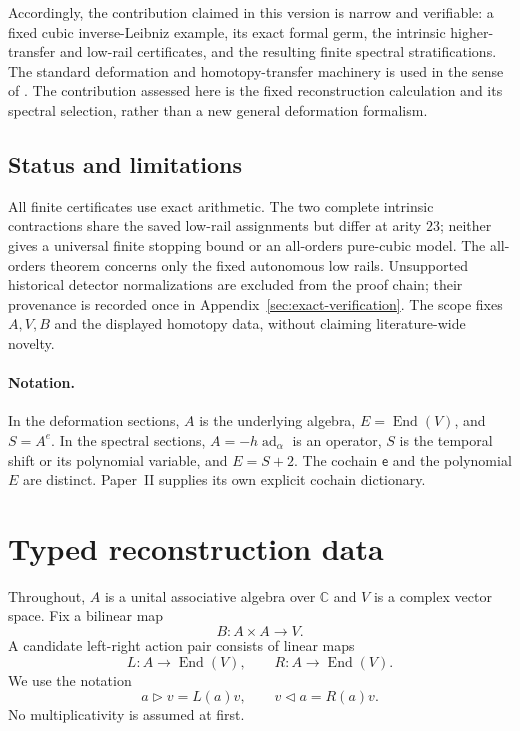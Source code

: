 \documentclass[11pt]{amsart}
\newcommand{\End}{\operatorname{End}}
\newcommand{\C}{\mathbb C}
\begin{document}
Accordingly, the contribution claimed in this version is narrow and verifiable: a fixed cubic inverse-Leibniz example, its exact formal germ, the intrinsic higher-transfer and low-rail certificates, and the resulting finite spectral stratifications.  The standard deformation and homotopy-transfer machinery is used in the sense of
\cite{GerstenhaberSchack1988,Manetti2005,LodayVallette2012}. The contribution assessed here is
the fixed reconstruction calculation and its spectral selection, rather than a new general
deformation formalism.

\subsection*{Status and limitations}
All finite certificates use exact arithmetic. The two complete intrinsic
contractions share the saved low-rail assignments but differ at arity $23$;
neither gives a universal finite stopping bound or an all-orders pure-cubic
model. The all-orders theorem concerns only the fixed autonomous low rails.
Unsupported historical detector normalizations are excluded from the proof
chain; their provenance is recorded once in Appendix~\ref{sec:exact-verification}.
The scope fixes $A,V,B$ and the displayed homotopy data, without claiming
literature-wide novelty.

\paragraph{Notation.}
In the deformation sections, $A$ is the underlying algebra, $E=\End(V)$,
and $S=A^e$. In the spectral sections, $A=-h\operatorname{ad}_\alpha$
is an operator, $S$ is the temporal shift or its polynomial variable,
and $E=S+2$. The cochain $\mathsf e$ and the polynomial $E$ are distinct.
Paper~II supplies its own explicit cochain dictionary.

\section{Typed reconstruction data}

Throughout, $A$ is a unital associative algebra over $\C$ and $V$ is a complex vector space.  Fix a bilinear map
\[
B:A\times A\longrightarrow V.
\]
A candidate left-right action pair consists of linear maps
\[
L:A\longrightarrow\End(V),
\qquad
R:A\longrightarrow\End(V).
\]
We use the notation
\[
a\triangleright v=L(a)v,
\qquad
v\triangleleft a=R(a)v.
\]
No multiplicativity is assumed at first.
\end{document}
